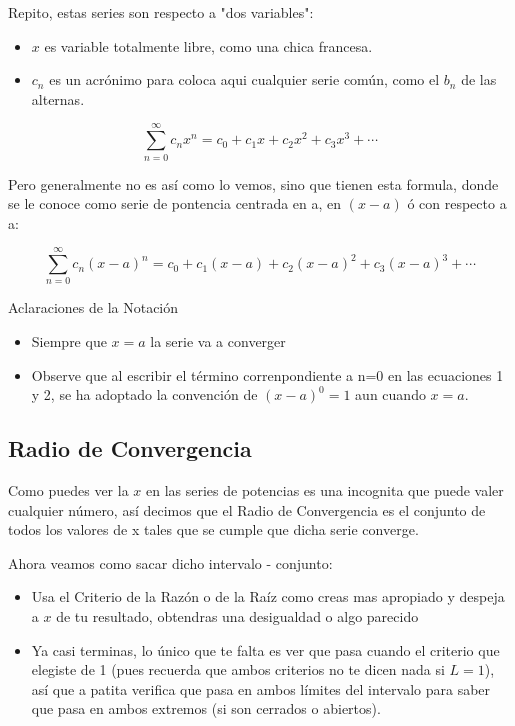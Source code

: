 \documentclass[12pt]{report}                                %
\begin{document}
        Repito, estas series son respecto a "dos variables":
        \begin{itemize}
            \item $x$ es variable totalmente libre, como una chica francesa.
            \item $c_n$ es un acrónimo para coloca aqui cualquier serie común, como el 
            $b_n$ de las alternas.
        \end{itemize}

        \begin{equation}
            \sum_{n=0}^{\infty} c_n x^n = c_0 + c_1x + c_2x^2 + c_3x^3 + \cdots
        \end{equation}

        Pero generalmente no es así como lo vemos, sino que tienen esta formula, 
        donde se le conoce como serie de pontencia centrada en a, en $(x-a)$ ó
        con respecto a a:

        \begin{equation}
            \sum_{n=0}^{\infty} c_n (x-a)^n = c_0 + c_1(x-a) + c_2(x-a)^2 + c_3(x-a)^3 + \cdots
        \end{equation}


        Aclaraciones de la Notación  
        \begin{itemize}
            \item Siempre que $x = a$ la serie va a converger
            \item Observe que al escribir el término correnpondiente a n=0 
                  en las ecuaciones 1 y 2, se ha adoptado la convención de
                  $(x-a)^0=1$ aun cuando $x=a$. 
        \end{itemize}


    \subsection{Radio de Convergencia}
        Como puedes ver la $x$ en las series de potencias es una incognita que puede
        valer cualquier número, así decimos que el Radio de Convergencia es el conjunto de
        todos los valores de x tales que se cumple que dicha serie converge.

        Ahora veamos como sacar dicho intervalo - conjunto:

        \begin{itemize}
            \item Usa el Criterio de la Razón o de la Raíz como creas mas apropiado
            y despeja a $x$ de tu resultado, obtendras una desigualdad o algo parecido

            \item Ya casi terminas, lo único que te falta es ver que pasa cuando el 
            criterio que elegiste de 1 (pues recuerda que ambos criterios no te dicen nada
            si $L=1$), así que a patita verifica que pasa en ambos límites del intervalo para
            saber que pasa en ambos extremos (si son cerrados o abiertos). 
        \end{itemize}
\end{document}
